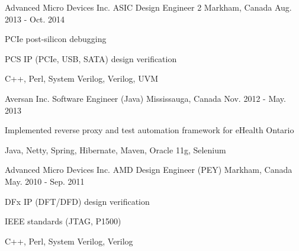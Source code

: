 \begin{cventries}
  \cventry
    {Advanced Micro Devices Inc.} %
    {ASIC Design Engineer 2} %
    {Markham, Canada} %
    {Aug. 2013 - Oct. 2014} %
    {
      \begin{cvitems} %
        \item {PCIe post-silicon debugging}
        \item {PCS IP (PCIe, USB, SATA) design verification}
        \item {C++, Perl, System Verilog, Verilog, UVM}
      \end{cvitems}
    }

  \cventry
    {Aversan Inc.} %
    {Software Engineer (Java)} %
    {Mississauga, Canada} %
    {Nov. 2012 - May. 2013} %
    {
      \begin{cvitems} %
        \item {Implemented reverse proxy and test automation framework for eHealth Ontario}
        \item {Java, Netty, Spring, Hibernate, Maven, Oracle 11g, Selenium}
      \end{cvitems}
    }

  \cventry
    {Advanced Micro Devices Inc.} %
    {AMD Design Engineer (PEY)} %
    {Markham, Canada} %
    {May. 2010 - Sep. 2011} %
    {
      \begin{cvitems} %
        \item {DFx IP (DFT/DFD) design verification}
        \item {IEEE standards (JTAG, P1500)}
        \item {C++, Perl, System Verilog, Verilog}
      \end{cvitems}
    }

\end{cventries}
